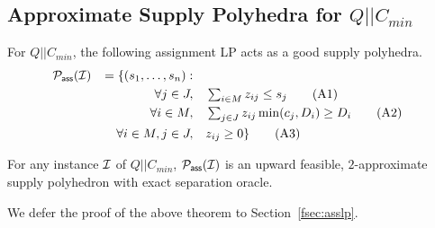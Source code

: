 \subsection{Approximate Supply Polyhedra for $Q||C_{min}$}
\def\pv{\mathbf{b}}
%
%
\noindent
For $Q||C_{min}$, the following assignment LP acts as a good supply polyhedra.
\begin{alignat}{4}
	{\cal P}_\mathsf{ass}({\cal I})  && = \{(s_1,\ldots,s_n):  && \notag \\
	&& \quad \forall j \in J,   &\quad  \textstyle \sum_{i\in M} z_{ij}  \leq  s_j \label{feq:asslp1} \tag{A1} \\
	&& \quad \forall i\in M ,  &\quad  \textstyle \sum_{j\in J}  z_{ij}  \min(c_j,D_i) \geq D_i \label{feq:asslp2} \tag{A2}\\
	&& \quad \forall i\in M, j\in J, & \quad z_{ij}   \geq 0 \label{feq:asslp3}  \} \tag{A3}
\end{alignat}
\begin{theorem}\label{fthm:asslp}
	For any instance ${\cal I}$ of $Q||C_{min}$, ${\cal P}_\mathsf{ass}({\cal I})$ is an upward feasible, $2$-approximate supply polyhedron with exact separation oracle.
\end{theorem}
\noindent
We defer the proof of the above theorem to Section~\ref{fsec:asslp}.

